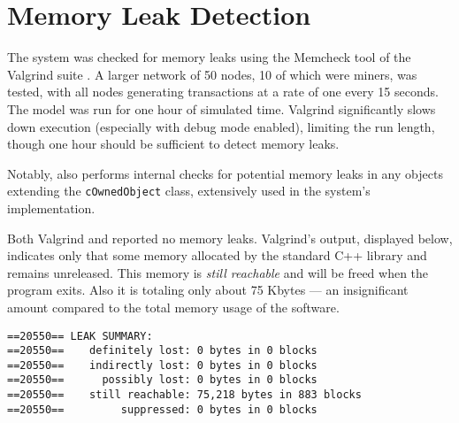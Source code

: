 \section{Memory Leak Detection}\label{sec:memory-tests}

The system was checked for memory leaks using the Memcheck tool \cite{memcheck}
of the Valgrind suite \cite{valgrind}. A larger network of 50 nodes, 10 of
which were miners, was tested, with all nodes generating transactions at a rate
of one every 15 seconds. The model was run for one hour of simulated time.
Valgrind significantly slows down execution (especially with debug mode
enabled), limiting the run length, though one hour should be sufficient to
detect memory leaks.

Notably, \omnetpp{} also performs internal checks for potential memory leaks in
any objects extending the \texttt{cOwnedObject} class, extensively used in the
system's implementation.

Both Valgrind and \omnetpp{} reported no memory leaks. Valgrind's output,
displayed below, indicates only that some memory allocated by the standard C++
library and \omnetpp{} remains unreleased. This memory is \textit{still
reachable} and will be freed when the program exits. Also it is totaling only
about 75 Kbytes --- an insignificant amount compared to the total memory usage
of the software.

\begin{verbatim}
==20550== LEAK SUMMARY:
==20550==    definitely lost: 0 bytes in 0 blocks
==20550==    indirectly lost: 0 bytes in 0 blocks
==20550==      possibly lost: 0 bytes in 0 blocks
==20550==    still reachable: 75,218 bytes in 883 blocks
==20550==         suppressed: 0 bytes in 0 blocks
\end{verbatim}
